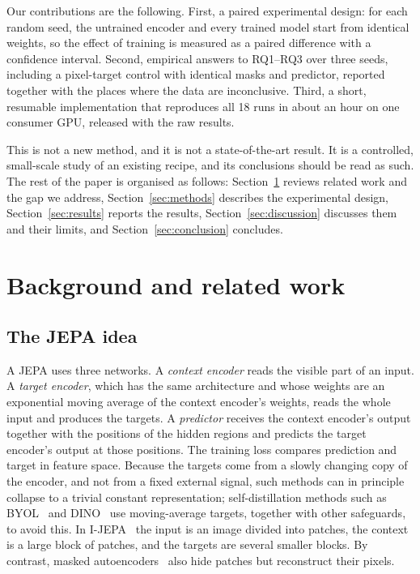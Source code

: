 \documentclass[pdflatex,sn-basic]{sn-jnl}%
\begin{document}
Our contributions are the following. First, a paired experimental design: for each random seed, the untrained encoder and every trained model start from identical weights, so the effect of training is measured as a paired difference with a confidence interval. Second, empirical answers to RQ1--RQ3 over three seeds, including a pixel-target control with identical masks and predictor, reported together with the places where the data are inconclusive. Third, a short, resumable implementation that reproduces all 18 runs in about an hour on one consumer GPU, released with the raw results.

This is not a new method, and it is not a state-of-the-art result. It is a controlled, small-scale study of an existing recipe, and its conclusions should be read as such. The rest of the paper is organised as follows: Section~\ref{sec:related} reviews related work and the gap we address, Section~\ref{sec:methods} describes the experimental design, Section~\ref{sec:results} reports the results, Section~\ref{sec:discussion} discusses them and their limits, and Section~\ref{sec:conclusion} concludes.

\section{Background and related work}\label{sec:related}

\subsection{The JEPA idea}\label{sec:jepa-idea}
A JEPA uses three networks. A \emph{context encoder} reads the visible part of an input. A \emph{target encoder}, which has the same architecture and whose weights are an exponential moving average of the context encoder's weights, reads the whole input and produces the targets. A \emph{predictor} receives the context encoder's output together with the positions of the hidden regions and predicts the target encoder's output at those positions. The training loss compares prediction and target in feature space. Because the targets come from a slowly changing copy of the encoder, and not from a fixed external signal, such methods can in principle collapse to a trivial constant representation; self-distillation methods such as BYOL~\cite{grill2020byol} and DINO~\cite{caron2021dino} use moving-average targets, together with other safeguards, to avoid this. In I-JEPA~\cite{assran2023ijepa} the input is an image divided into patches, the context is a large block of patches, and the targets are several smaller blocks. By contrast, masked autoencoders~\cite{he2022mae} also hide patches but reconstruct their pixels.
\end{document}

